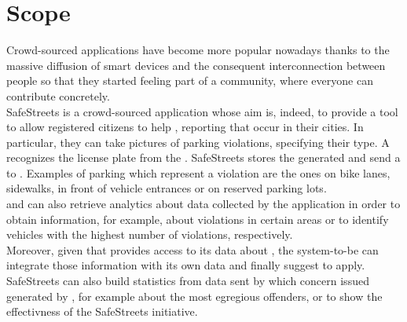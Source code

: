 \documentclass[../../RASD.tex]{subfiles}
\begin{document}
\section{Scope\label{sect:1.2}}
	
Crowd-sourced applications have become more popular nowadays thanks to the massive diffusion of smart devices and the consequent interconnection between people so that they started feeling part of a community, where everyone can contribute concretely.\\

SafeStreets is a crowd-sourced application whose aim is, indeed, to provide a tool to allow registered citizens to help , reporting  that occur in their cities. In particular, they can take pictures of parking violations, specifying their type. A  recognizes the license plate from the . SafeStreets stores the generated  and send a  to . Examples of parking which represent a violation are the ones on bike lanes, sidewalks, in front of vehicle entrances or on reserved parking lots.\\
 and  can also retrieve analytics about data collected by the application in order to obtain information, for example, about violations in certain areas or to identify vehicles with the highest number of violations, respectively.\\

Moreover, given that  provides access to its data about , the system-to-be can integrate those information with its own data and finally suggest   to apply.\\
SafeStreets can also build statistics from data sent by  which concern issued  generated by , for example about the most egregious offenders, or to show the effectivness of the SafeStreets initiative.

		
\end{document}
